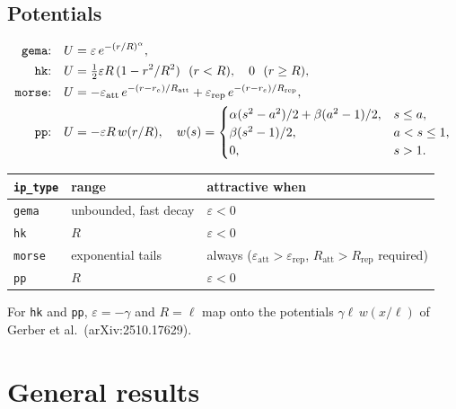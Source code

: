 \documentclass[11pt]{article}
\newcommand{\code}[1]{\texttt{#1}}
\begin{document}
\subsection{Potentials}
\begin{align}
  \text{\code{gema}:}\quad & U = \varepsilon\,e^{-(r/R)^\alpha}, \\
  \text{\code{hk}:}\quad & U = \tfrac12\varepsilon R\,(1-r^2/R^2) \ \ (r<R),\quad 0 \ \ (r\ge R), \\
  \text{\code{morse}:}\quad & U = -\varepsilon_{\mathrm{att}}\,e^{-(r-r_e)/R_{\mathrm{att}}}
      + \varepsilon_{\mathrm{rep}}\,e^{-(r-r_e)/R_{\mathrm{rep}}}, \\
  \text{\code{pp}:}\quad & U = -\varepsilon R\,w(r/R),\quad
      w(s) = \begin{cases}
        \alpha(s^2-a^2)/2 + \beta(a^2-1)/2, & s\le a,\\
        \beta(s^2-1)/2, & a<s\le1,\\
        0, & s>1 .
      \end{cases}
\end{align}
\begin{center}
\begin{tabular}{@{}lll@{}}
\toprule
\code{ip\_type} & range & attractive when \\
\midrule
\code{gema} & unbounded, fast decay & $\varepsilon<0$ \\
\code{hk} & $R$ & $\varepsilon<0$ \\
\code{morse} & exponential tails & always ($\varepsilon_{\mathrm{att}}>\varepsilon_{\mathrm{rep}}$, $R_{\mathrm{att}}>R_{\mathrm{rep}}$ required) \\
\code{pp} & $R$ & $\varepsilon<0$ \\
\bottomrule
\end{tabular}
\end{center}
For \code{hk} and \code{pp}, $\varepsilon=-\gamma$ and $R=\ell$ map onto the
potentials $\gamma\ell\,w(x/\ell)$ of Gerber et al.\ (arXiv:2510.17629).

\section{General results}
\end{document}
